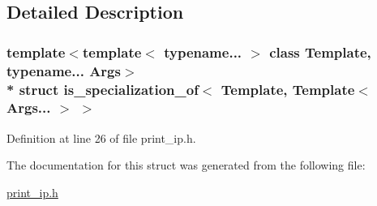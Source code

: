 \subsection{Detailed Description}
\subsubsection*{template$<$template$<$ typename... $>$ class Template, typename... Args$>$\\*
struct is\+\_\+specialization\+\_\+of$<$ Template, Template$<$ Args... $>$ $>$}



Definition at line 26 of file print\+\_\+ip.\+h.



The documentation for this struct was generated from the following file\+:\begin{DoxyCompactItemize}
\item 
\hyperlink{print__ip_8h}{print\+\_\+ip.\+h}\end{DoxyCompactItemize}
